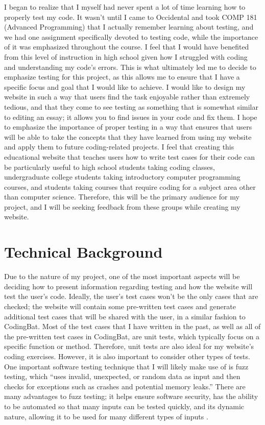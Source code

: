 \documentclass[10pt,twocolumn]{article}
\begin{document}
I began to realize that I myself had never spent a lot of time learning how to properly test my code. It wasn’t until I came to Occidental and took COMP 181 (Advanced Programming) that I actually remember learning about testing, and we had one assignment specifically devoted to testing code, while the importance of it was emphasized throughout the course. I feel that I would have benefited from this level of instruction in high school given how I struggled with coding and understanding my code's errors. This is what ultimately led me to decide to emphasize testing for this project, as this allows me to ensure that I have a specific focus and goal that I would like to achieve. I would like to design my website in such a way that users find the task enjoyable rather than extremely tedious, and that they come to see testing as something that is somewhat similar to editing an essay; it allows you to find issues in your code and fix them. I hope to emphasize the importance of proper testing in a way that ensures that users will be able to take the concepts that they have learned from using my website and apply them to future coding-related projects. I feel that creating this educational website that teaches users how to write test cases for their code can be particularly useful to high school students taking coding classes, undergraduate college students taking introductory computer programming courses, and students taking courses that require coding for a subject area other than computer science. Therefore, this will be the primary audience for my project, and I will be seeking feedback from these groups while creating my website.

\section{Technical Background}

Due to the nature of my project, one of the most important aspects will be deciding how to present information regarding testing and how the website will test the user’s code. Ideally, the user’s test cases won’t be the only cases that are checked; the website will contain some pre-written test cases and generate additional test cases that will be shared with the user, in a similar fashion to CodingBat. Most of the test cases that I have written in the past, as well as all of the pre-written test cases in CodingBat, are unit tests, which typically focus on a specific function or method. Therefore, unit tests are also ideal for my website’s coding exercises. However, it is also important to consider other types of tests. One important software testing technique that I will likely make use of is fuzz testing, which “uses invalid, unexpected, or random data as input and then checks for exceptions such as crashes and potential memory leaks.” There are many advantages to fuzz testing; it helps ensure software security, has the ability to be automated so that many inputs can be tested quickly, and its dynamic nature, allowing it to be used for many different types of inputs \cite{Fuzz}.
\end{document}
